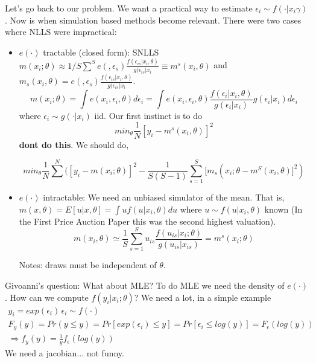 \documentclass[12pt]{article}
\begin{document}
	Let's go back to our problem. We want a practical way to estimate $\epsilon_i \sim f(\cdot | x_i \gamma )$. Now is when simulation based methods become relevant. There were two cases where NLLS were impractical:
	\begin{itemize}
		\item $e(\cdot)$ tractable (closed form): SNLLS $m(x_i; \theta) \approx 1/S \sum^S e(, \epsilon_s ) \frac{f(\epsilon_{is} | x_i , \theta)}{ g(\epsilon_{is} | x_i} \equiv m^s(x_i,\theta)$ and $m_s(x_i,\theta) = e(, \epsilon_s ) \frac{f(\epsilon_{is} | x_i , \theta)}{ g(\epsilon_{is} | x_i}$.
		\begin{equation}
			m(x_i;\theta) = \int e(x_i, \epsilon_i, \theta) d \epsilon_i = \int e(x_i, \epsilon_i, \theta) \frac{f(\epsilon_i | x_i, \theta)}{g(\epsilon_i | x_i)} g(\epsilon_i | x_i) d \epsilon_i
		\end{equation}
		where $\epsilon_i \sim g(\cdot | x_i)$ iid. Our first instinct is to do
		\begin{equation}
			min_\theta \frac{1}{N} [y_i - m^s(x_i, \theta)]^2
		\end{equation}
		\textbf{dont do this}. We should do,

		\begin{equation}
			min_\theta \frac{1}{N} \sum^N ( [y_i - m(x_i; \theta)]^2 - \frac{1}{S(S-1)} \sum^S_{s = 1} [m_s(x_i;\theta - m^S(x_i,\theta)]^2 )
		\end{equation}

	\item $e(\cdot)$ intractable: We need an unbiased simulator of the mean. That is, $m(x,\theta) = E[u | x, \theta] = \int u f(u|x_i,\theta) du$ where $u \sim f(u|x_i,\theta)$ known (In the First Price Auction Paper this was the second highest valuation).
		\begin{equation}
			m(x_i, \theta) \simeq \frac{1}{S} \sum^S_{s = 1} u_{is} \frac{f(u_{is} |x_i; \theta) }{g(u_{is} | x_{is} )} = m^s(x_i;\theta)
		\end{equation}

		Notes: draws must be independent of $\theta$.
	\end{itemize}

	Givoanni's question: What about MLE? To do MLE we need the density of $e(\cdot)$. How can we compute $f(y_i|x_i;\theta)$? We need a lot, in a simple example
	\begin{eqnarray*}
		y_i = exp(\epsilon_i) \, \epsilon_i \sim f(\cdot) \\
		F_y(y) = Pr(y \leq y) = Pr[exp(\epsilon_i) \leq y] = Pr[\epsilon_i \leq log(y)] = F_\epsilon (log(y)) \\
		\Rightarrow f_y (y) = \frac{1}{y} f_\epsilon(log(y))
	\end{eqnarray*}
	We need a jacobian... not funny.
\end{document}
